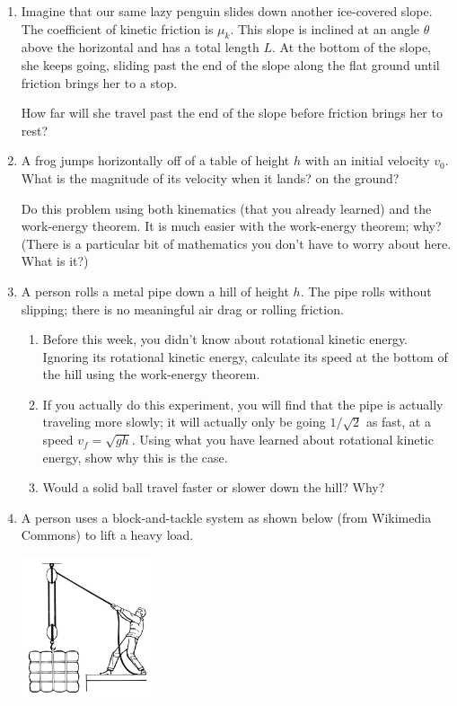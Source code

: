 \documentclass[12pt]{article}
\begin{document}
\begin{enumerate}
\item{Imagine that our same lazy penguin slides down another ice-covered slope. The coefficient of kinetic friction is $\mu_k$.
This slope is inclined at an angle $\theta$ above the horizontal and has a total length $L$. At the bottom of the slope, she keeps going, sliding past the end of the slope along the flat ground until friction brings her to a stop.

How far will she travel past the end of the slope before friction brings her to rest?}

\item{A frog jumps horizontally off of a table of height $h$ with an initial velocity $v_0$. What is the magnitude of its velocity when it lands?
    on the ground?

Do this problem using both kinematics (that you already learned) and the work-energy theorem. It is much easier with the work-energy theorem; why? (There is a particular
bit of mathematics you don't have to worry about here. What is it?)}



\item A person rolls a metal pipe down a hill of height $h$. The pipe rolls without slipping; there is no meaningful air drag or rolling friction.

\begin{enumerate}
\item Before this week, you didn't know about rotational kinetic energy. Ignoring its rotational kinetic energy, calculate its speed at the bottom of the
hill using the work-energy theorem.
\item If you actually do this experiment, you will find that the pipe is actually traveling more slowly; it will actually only be going $1/\sqrt{2}$ as fast, at a speed $v_f = \sqrt {gh}$. Using what you have learned about rotational kinetic energy, show why this is the case.
\item Would a solid ball travel faster or slower down the hill? Why?
\end{enumerate}


\item{A person uses a block-and-tackle system as shown below (from Wikimedia Commons) to lift a heavy load.

       \includegraphics[width=0.3\textwidth]{blockandtackle.png}

}
\end{enumerate}
\end{document}
